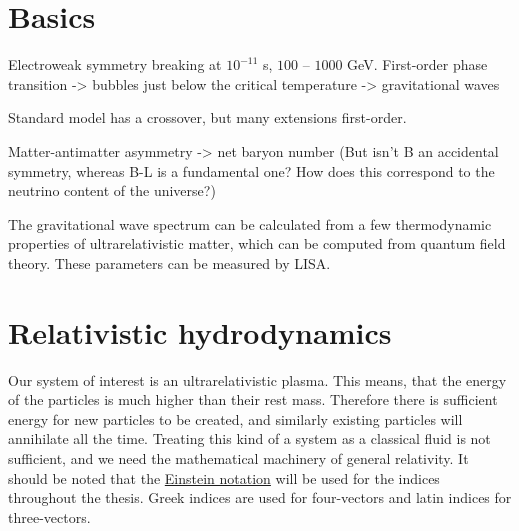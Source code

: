 \section{Basics}
Electroweak symmetry breaking at $10^{-11}$ s, $100$ -- $1000$ GeV.
First-order phase transition
-> bubbles just below the critical temperature
-> gravitational waves

Standard model has a crossover, but many extensions first-order.

Matter-antimatter asymmetry -> net baryon number
(But isn't B an accidental symmetry, whereas B-L is a fundamental one?
How does this correspond to the neutrino content of the universe?)
\cite{lecture_notes}

The gravitational wave spectrum can be calculated from a few thermodynamic properties of ultrarelativistic matter, which can be computed from quantum field theory.
These parameters can be measured by LISA.



\section{Relativistic hydrodynamics}
\label{rel_hydro}

Our system of interest is an ultrarelativistic plasma.
This means, that the energy of the particles is much higher than their rest mass.
Therefore there is sufficient energy for new particles to be created,
and similarly existing particles will annihilate all the time.
Treating this kind of a system as a classical fluid is not sufficient,
and we need the mathematical machinery of general relativity.
It should be noted that the
\href{https://en.wikipedia.org/wiki/Einstein_notation}{Einstein notation} will be used for the indices throughout the thesis.
Greek indices are used for four-vectors and latin indices for three-vectors.

